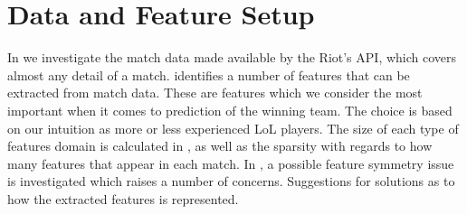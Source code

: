 \section{Data and Feature Setup}\label{sec:features}
In  we investigate the match data made available by the Riot's API, which covers almost any detail of a match.
 identifies a number of features that can be extracted from match data. These are features which we consider the most important when it comes to prediction of the winning team. The choice is based on our intuition as more or less experienced LoL players. The size of each type of features domain is calculated in , as well as the sparsity with regards to how many features that appear in each match.
In , a possible feature symmetry issue is investigated which raises a number of concerns. Suggestions for solutions as to how the extracted features is represented. 

